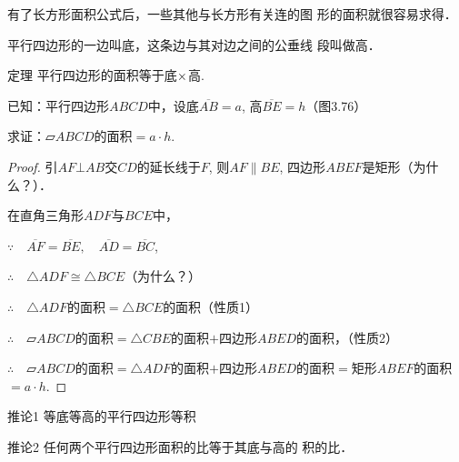     有了长方形面积公式后，一些其他与长方形有关连的图
    形的面积就很容易求得．

    平行四边形的一边叫底，这条边与其对边之间的公垂线
    段叫做高．

\begin{blk}
    {定理}
平行四边形的面积等于底$\times$高.
\end{blk}

已知：平行四边形$ABCD$中，设底$\overline{AB}=a$, 高$\overline{BE}=h$（图3.76）

求证：$\parallelogram ABCD$的面积$=a\cdot h$.

\begin{figure}[htp]
    \centering
    \caption{}
\end{figure}

\begin{proof}
    引$AF\bot AB$交$CD$的延长线于$F$, 
    则$AF\parallel BE$, 四边形$ABEF$是矩形（为什么？）．

    在直角三角形$ADF$与$BCE$中，

$\because\quad \overline{AF}=\overline{BE},\quad \overline{AD}=\overline{BC}$,

$\therefore\quad     \triangle ADF\cong \triangle BCE$（为什么？）

$\therefore\quad \triangle ADF$的面积$=\triangle BCE$的面积（性质1）

$\therefore\quad \parallelogram ABCD$的面积$=\triangle CBE$的面积$+$四边形$ABED$的面积，（性质2）

$\therefore\quad \parallelogram ABCD$的面积$=\triangle ADF$的面积$+$四边形$ABED$的面积$=$矩形$ABEF$的面积$=a\cdot h$.
\end{proof}


\begin{blk}
    {推论1} 等底等高的平行四边形等积
\end{blk}

\begin{blk}
    {推论2} 任何两个平行四边形面积的比等于其底与高的
积的比．
\end{blk}

